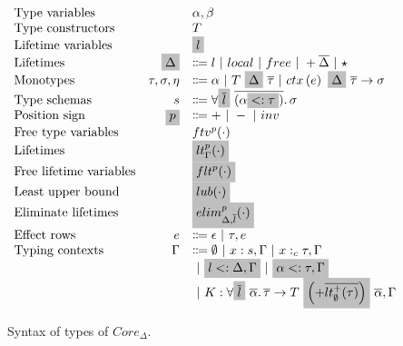 \documentclass[11pt]{article}
\newcommand{\graybox}[1]{\colorbox{lightgray}{$\displaystyle #1$}}
\newcommand{\vor}{~|~}
\newcommand{\ap}{~}
\newcommand{\ctx}[1]{ctx\left(#1\right)~}
\begin{document}

    \begin{figure}
        \[
            \begin{array}{lrl}
                \text{Type variables} && \alpha, \beta \\
                \text{Type constructors} && T \\
                \text{Lifetime variables} && \graybox{l} \\
                \text{Lifetimes} & \graybox{\Delta} &\Coloneqq l \vor local \vor free \vor +\overline{\Delta} \vor \star \\
                \text{Monotypes} & \tau, \sigma, \eta &\Coloneqq \alpha \vor T \ap \graybox{\Delta} \ap \overline{\tau} \vor \ctx{e} \graybox{\Delta}~\overline{\tau} \to \sigma \\
                \text{Type schemas} & s &\Coloneqq \forall \graybox{\overline{l}}~\overline{(\alpha \graybox{<: \tau})}\ldotp \sigma \\
                \text{Position sign} & \graybox{p} & \Coloneqq + \vor - \vor inv \\
                \text{Free type variables} & & ftv^p(\cdot) \\
                \text{Lifetimes} & & \graybox{lt_\Gamma^p(\cdot)} \\
                \text{Free lifetime variables} & & \graybox{flt^p(\cdot)} \\
                \text{Least upper bound} & & \graybox{lub(\cdot)} \\
                \text{Eliminate lifetimes} & & \graybox{elim^p_{\Delta, \overline{l}}(\cdot)} \\
                \text{Effect rows} & e &\Coloneqq \epsilon\vor \tau, e \\
                \text{Typing contexts} & \Gamma &\Coloneqq \emptyset \vor x : s, \Gamma \vor x :_c \tau, \Gamma \\
                & & \vor \graybox{l <: \Delta, \Gamma} \vor \graybox{\alpha <: \tau, \Gamma} \\
                & &\vor K : \forall\graybox{\overline{l}}\ \overline{\alpha}\ldotp \overline{\tau}\to T \ap\graybox{\left(+\overline{lt_\emptyset^+(\tau)}\right)}\ap \overline{\alpha}, \Gamma
            \end{array}
        \]
        \caption{Syntax of types of $Core_\Delta$.}
        \label{fig:core-delta-syntax}
    \end{figure}
\end{document}
